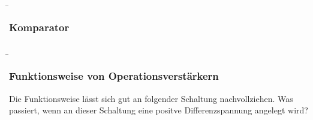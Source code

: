 \begin{frame}
\end{frame}

\begin{frame}
    \b{
    \frametitle{Komparator}
    \begin{figure}[H]
    \centering
    \begin{subfigure}[b]{\textwidth}
        \centering
        
    \end{subfigure}

    \begin{subfigure}[b]{\textwidth}
        \centering
        
    \end{subfigure}
    \label{fig:Komparator}
    \end{figure}
    }
\end{frame}

\begin{frame}
   \b{
    \frametitle{Funktionsweise von Operationsverstärkern}
    Die Funktionsweise lässt sich gut an folgender Schaltung nachvollziehen. Was passiert, wenn an dieser Schaltung eine positve Differenzspannung angelegt wird?
    \begin{figure}[ht]
        \centering
    \end{figure}
   } 
\end{frame}

